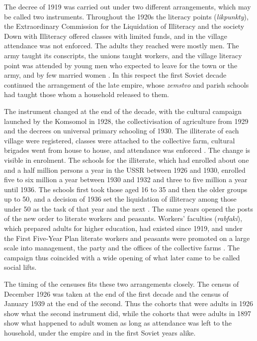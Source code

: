 \documentclass[12pt]{article}
\begin{document}
The decree of 1919 was carried out under two different arrangements, which may be called two instruments. Throughout the 1920s the literacy points (\emph{likpunkty}), the Extraordinary Commission for the Liquidation of Illiteracy and the society Down with Illiteracy offered classes with limited funds, and in the village attendance was not enforced. The adults they reached were mostly men. The army taught its conscripts, the unions taught workers, and the village literacy point was attended by young men who expected to leave for the town or the army, and by few married women \citep{clark2000,eklof1987,kenez1985}. In this respect the first Soviet decade continued the arrangement of the late empire, whose \emph{zemstvo} and parish schools had taught those whom a household released to them.

The instrument changed at the end of the decade, with the cultural campaign launched by the Komsomol in 1928, the collectivisation of agriculture from 1929 and the decrees on universal primary schooling of 1930. The illiterate of each village were registered, classes were attached to the collective farm, cultural brigades went from house to house, and attendance was enforced \citep{fitzpatrick1979,eklof1987}. The change is visible in enrolment. The schools for the illiterate, which had enrolled about one and a half million persons a year in the USSR between 1926 and 1930, enrolled five to six million a year between 1930 and 1932 and three to five million a year until 1936. The schools first took those aged 16 to 35 and then the older groups up to 50, and a decision of 1936 set the liquidation of illiteracy among those under 50 as the task of that year and the next \citep{bse1938}. The same years opened the posts of the new order to literate workers and peasants. Workers' faculties (\emph{rabfaki}), which prepared adults for higher education, had existed since 1919, and under the First Five-Year Plan literate workers and peasants were promoted on a large scale into management, the party and the offices of the collective farms \citep{fitzpatrick1979}. The campaign thus coincided with a wide opening of what later came to be called social lifts.

The timing of the censuses fits these two arrangements closely. The census of December 1926 was taken at the end of the first decade and the census of January 1939 at the end of the second. Thus the cohorts that were adults in 1926 show what the second instrument did, while the cohorts that were adults in 1897 show what happened to adult women as long as attendance was left to the household, under the empire and in the first Soviet years alike.
\end{document}
